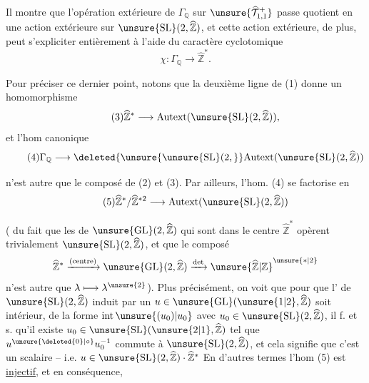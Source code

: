 Il montre que l'opération extérieure de
$\Gamma_{\mathbb Q}$ sur $\unsure{\widehat{\mathcal T}_{1,1}^{+}}$
passe  quotient en une
action extérieure sur $\unsure{\mathrm{SL}}(2,\widehat{\mathbb Z})$, et cette
action extérieure, de plus, peut s'expliciter
entièrement à l'aide du caractère
cyclotomique
\[
\tag{2}
\chi : \Gamma_{\mathbb Q}\longrightarrow \widehat{\mathbb Z}^{*}.
\]

Pour préciser ce dernier point, notons
que la deuxième ligne de (1) donne
un homomorphisme
\[
\tag{3}
\widehat{\mathbb Z}^{*}\longrightarrow
\mathrm{Autext}(\unsure{\mathrm{SL}}(2,\widehat{\mathbb Z})),
\]
et l'hom canonique
\[
\tag{4}
\Gamma_{\mathbb Q}\longrightarrow
\deleted{\unsure{\unsure{\mathrm{SL}}(2,}}
\mathrm{Autext}(\unsure{\mathrm{SL}}(2,\widehat{\mathbb Z}))
\]


n'est autre que le composé de (2) et (3).
Par ailleurs, l'hom. (4) se factorise
en
\[
\tag{5}
\widehat{\mathbb Z}^{*}/\widehat{\mathbb Z}^{*2}
\longrightarrow \mathrm{Autext}(\unsure{\mathrm{SL}}(2,\widehat{\mathbb Z}))
\]

( du fait que les  de
$\unsure{\mathrm{GL}}(2,\widehat{\mathbb Z})$ qui sont dans le centre
$\widehat{\mathbb Z}^{*}$ opèrent trivialement
 $\unsure{\mathrm{SL}}(2,\widehat{\mathbb Z})$,
et que le composé
\[
\widehat{\mathbb Z}^{*}\xrightarrow{\text{(centre)}}
\unsure{\mathrm{GL}}(2,\widehat{\mathbb Z})\xrightarrow{\det}
\unsure{\widehat{\mathbb Z}|\mathbb Z}^{\unsure{*|2}}
\]
n'est autre que $\lambda\longmapsto\lambda^{\unsure{2}}$). Plus
précisément, on voit que pour que l'
 de $\unsure{\mathrm{SL}}(2,\widehat{\mathbb Z})$ induit par un
$u\in\unsure{\mathrm{GL}}(\unsure{1|2},\widehat{\mathbb Z})$ soit intérieur,
 de la forme
$\mathrm{int}\,\unsure{(u_0)|u_0}$ avec $u_0\in\unsure{\mathrm{SL}}(2,\widehat{\mathbb Z})$, il f. et s.
qu'il existe $u_0\in\unsure{\mathrm{SL}}(\unsure{2|1},\widehat{\mathbb Z})$ tel que
$u^{\unsure{\deleted{0}|\circ}}u_0^{-1}$ commute à $\unsure{\mathrm{SL}}(2,\widehat{\mathbb Z})$, et cela signifie
que c'est un scalaire -- i.e.
$u\in\unsure{\mathrm{SL}}(2,\widehat{\mathbb Z})\cdot\widehat{\mathbb Z}^{*}$
En d'autres termes
l'hom (5) est \uline{injectif}, et en conséquence,


